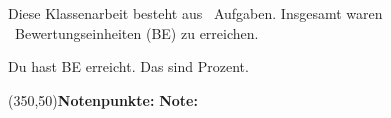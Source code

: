 \begin{coverpages}
\begin{center}
\vspace*{0.7cm}
Diese Klassenarbeit besteht aus \numquestions\ Aufgaben. Insgesamt waren \numpoints\ Bewertungseinheiten (BE) zu erreichen. \smallskip

Du hast \underline{\hspace*{1.5cm}} BE erreicht. Das sind \underline{\hspace*{1.5cm}} Prozent. \medskip


\framebox(350,50){\textbf{Notenpunkte:} \underline{\hspace*{2cm}} \hspace*{1cm} \textbf{Note:} \underline{\hspace*{2cm}}}


\end{center}

\vfill
{}
\end{coverpages}
\restoregeometry